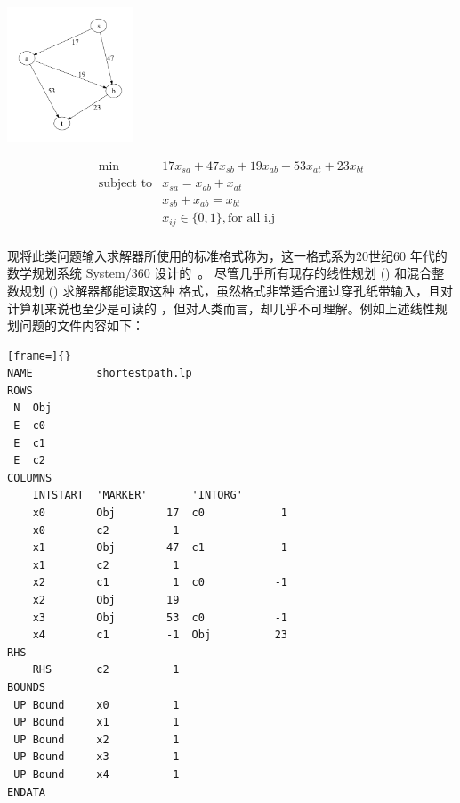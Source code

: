 \begin{minipage}[c]{0.3\linewidth}
  \begin{center}
    \label{stexample}
    \includegraphics[height=4cm]{stexample}
  \end{center}
\end{minipage}
%
\begin{minipage}[c]{0.5\linewidth}
  $$
   \begin{array}{rll}
    \min& 17 x_{sa} + 47 x_{sb} + 19 x_{ab} + 53 x_{at} + 23 x_{bt}     \\
    \mbox{subject to}& x_{sa} = x_{ab} + x_{at} \\
    & x_{sb} + x_{ab} = x_{bt} \\
    &x_{ij} \in \{0,1\}, \mbox{for all {i,j}}\\
  \end{array}
  $$
\end{minipage}

现将此类问题输入求解器所使用的标准格式称为\mps，这一格式系\ibm 为20世纪60
年代的数学规划系统 System/360 设计的~\cite{Kallrath2004b,Spielberg2004}。
尽管几乎所有现存的线性规划 (\lp) 和混合整数规划 (\mip) 求解器都能读取这种
格式，虽然\mps 格式非常适合通过穿孔纸带输入，且对计算机来说也至少是可读的
，但对人类而言，却几乎不可理解。例如上述线性规划问题的\mps 文件内容如下：

\begin{lstlisting}[frame=]{}
NAME          shortestpath.lp
ROWS
 N  Obj
 E  c0
 E  c1
 E  c2
COLUMNS
    INTSTART  'MARKER'       'INTORG'
    x0        Obj        17  c0            1
    x0        c2          1
    x1        Obj        47  c1            1
    x1        c2          1
    x2        c1          1  c0           -1
    x2        Obj        19
    x3        Obj        53  c0           -1
    x4        c1         -1  Obj          23
RHS
    RHS       c2          1
BOUNDS
 UP Bound     x0          1
 UP Bound     x1          1
 UP Bound     x2          1
 UP Bound     x3          1
 UP Bound     x4          1
ENDATA
\end{lstlisting}

